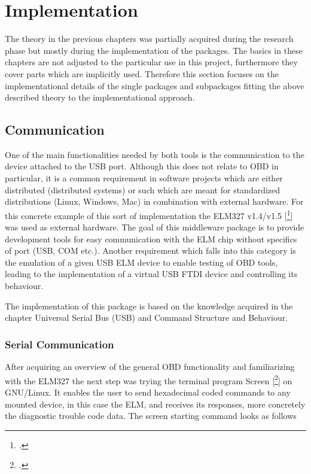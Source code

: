 
\chapter{Implementation}
\label{sec:impl}
The theory in the previous chapters was partially acquired during the research phase but mostly during the implementation of the packages. 
The basics in these chapters are not adjusted to the particular use in this project, furthermore they cover parts which are implicitly used. 
Therefore this section focuses on the implementational details of the single packages and subpackages fitting the above described theory to the 
implementational approach.

\section{Communication}
\label{sec:comm}
One of the main functionalities needed by both tools is the communication to the device attached to the USB port. Although this does not relate 
to OBD in particular, it is a common requirement in software projects which are either distributed (distributed systems) or  such which are 
meant for standardized distributions (Linux, Windows, Mac) in combination with external hardware. For this concrete example of this sort of 
implementation the ELM327 v1.4/v1.5 [\footcite{ELM}] was used as external hardware. The goal of this middleware package is to provide development tools for easy 
communication with the ELM chip without specifics of port (USB, COM etc.). Another requirement which falls into this category is the emulation 
of a given USB ELM device to enable testing of OBD tools, leading to the implementation of a virtual USB FTDI device and controlling its behaviour.

The implementation of this package is based on the knowledge acquired in the chapter Universal Serial Bus (USB) and Command Structure and Behaviour.

\subsection{Serial Communication}
\label{sec:serialComm}
After acquiring an overview of the general OBD functionality and familiarizing with the ELM327 the next step was trying the terminal program 
Screen [\footcite{SCREEN}] on GNU/Linux. It enables the user to send hexadecimal coded commands to any mounted device, in this case the ELM, and receives its responses, 
more concretely the diagnostic trouble code data. The screen starting command looks as follows

